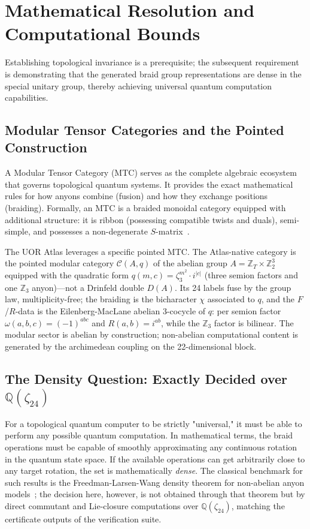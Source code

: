 \section{Mathematical Resolution and Computational Bounds}

Establishing topological invariance is a prerequisite; the subsequent requirement is demonstrating that the generated braid group representations are dense in the special unitary group, thereby achieving universal quantum computation capabilities.

\subsection{Modular Tensor Categories and the Pointed Construction}
A Modular Tensor Category (MTC) serves as the complete algebraic ecosystem that governs topological quantum systems. It provides the exact mathematical rules for how anyons combine (fusion) and how they exchange positions (braiding). Formally, an MTC is a braided monoidal category equipped with additional structure: it is ribbon (possessing compatible twists and duals), semi-simple, and possesses a non-degenerate $S$-matrix~\cite{bakalov2001}.

The UOR Atlas leverages a specific pointed MTC\@. The Atlas-native category is the pointed modular category $\mathcal{C}(A, q)$ of the abelian group $A = \mathbb{Z}_T \times \mathbb{Z}_2^3$ equipped with the quadratic form $q(m, c) = \zeta_3^{m^2} \cdot i^{|c|}$ (three semion factors and one $\mathbb{Z}_3$ anyon)---not a Drinfeld double $D(A)$. Its 24 labels fuse by the group law, multiplicity-free; the braiding is the bicharacter $\chi$ associated to $q$, and the $F$/$R$-data is the Eilenberg-MacLane abelian 3-cocycle of $q$: per semion factor $\omega(a,b,c) = {(-1)}^{abc}$ and $R(a,b) = i^{ab}$, while the $\mathbb{Z}_3$ factor is bilinear. The modular sector is abelian by construction; non-abelian computational content is generated by the archimedean coupling on the 22-dimensional block.

\subsection{The Density Question: Exactly Decided over \texorpdfstring{$\mathbb{Q}(\zeta_{24})$}{Q (zeta 24)}}
For a topological quantum computer to be strictly "universal," it must be able to perform any possible quantum computation. In mathematical terms, the braid operations must be capable of smoothly approximating any continuous rotation in the quantum state space. If the available operations can get arbitrarily close to any target rotation, the set is mathematically \textit{dense}. The classical benchmark for such results is the Freedman-Larsen-Wang density theorem for non-abelian anyon models~\cite{freedman2002}; the decision here, however, is not obtained through that theorem but by direct commutant and Lie-closure computations over $\mathbb{Q}(\zeta_{24})$, matching the certificate outputs of the verification suite.

